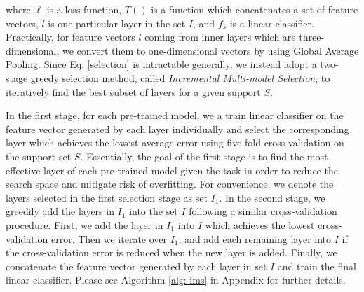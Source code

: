 \documentclass[runningheads]{llncs}
\begin{document}
\noindent where $\ell$ is a loss function, $T()$ is a function which concatenates a set of feature vectors, $l$ is one particular layer in the set $I$, and $f_s$ is a linear classifier. Practically, for feature vectors $l$ coming from inner layers which are three-dimensional, we convert them to one-dimensional vectors by using Global Average Pooling. Since Eq. \ref{selection} is intractable generally, we instead adopt a two-stage greedy selection method, called \textit{Incremental Multi-model Selection}, to iteratively find the best subset of layers for a given support $S$. 

In the first stage, for each pre-trained model, we a train linear classifier on the feature vector generated by each layer individually and select the corresponding layer which achieves the lowest average error using five-fold cross-validation on the support set $S$. Essentially, the goal of the first stage is to find the most effective layer of each pre-trained model given the task in order to reduce the search space and mitigate risk of overfitting. For convenience, we denote the layers selected in the first selection stage as set $I_1$. In the second stage, we greedily add the layers in $I_1$ into the set $I$ following a similar cross-validation procedure. First, we add the layer in $I_1$ into $I$ which achieves the lowest cross-validation error. Then we iterate over $I_1$, and add each remaining layer into $I$ if the cross-validation error is reduced when the new layer is added. Finally, we concatenate the feature vector generated by each layer in set $I$ and train the final linear classifier. Please see Algorithm \ref{alg: ims} in Appendix for further details.
\end{document}
